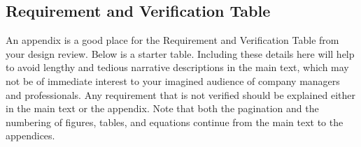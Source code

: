 \documentclass{senior-design}
\begin{document}
\begin{appendices}
    \chapter{Requirement and Verification Table}
    An appendix is a good place for the Requirement and Verification Table from your design review. Below is a starter table. Including these details here will help to avoid lengthy and tedious narrative descriptions in the main text, which may not be of immediate interest to your imagined audience of company managers and professionals. Any requirement that is not verified should be explained either in the main text or the appendix. Note that both the pagination and the numbering of figures, tables, and equations continue from the main text to the appendices.


\end{appendices}
\end{document}
